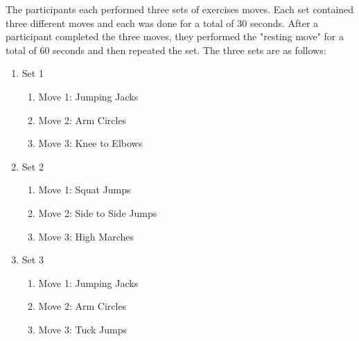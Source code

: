 The participants each performed three sets of exercises moves.  Each set contained three different moves and each was done for a total of 30 seconds.  After a participant completed the three moves, they performed the "resting move" for a total of 60 seconds and then repeated the set.  The three sets are as follows:
\begin{enumerate}
	\item Set 1
	\begin{enumerate}
		\item Move 1: Jumping Jacks
		\item Move 2: Arm Circles
		\item Move 3: Knee to Elbows
	\end{enumerate}
	\item Set 2
		\begin{enumerate}
		\item Move 1: Squat Jumps
		\item Move 2: Side to Side Jumps
		\item Move 3: High Marches
	\end{enumerate}	
	\item Set 3
	\begin{enumerate}
		\item Move 1: Jumping Jacks
		\item Move 2: Arm Circles
		\item Move 3: Tuck Jumps
	\end{enumerate}
\end{enumerate}